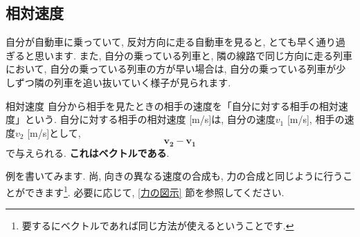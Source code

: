 \documentclass[11pt,dvipdfmx]{jsarticle}
\numberwithin{equation}{section} %
\begin{document}
\subsection{相対速度}
自分が自動車に乗っていて, 反対方向に走る自動車を見ると, とても早く通り過ぎると思います. また, 自分の乗っている列車と, 隣の線路で同じ方向に走る列車において, 自分の乗っている列車の方が早い場合は, 自分の乗っている列車が少しずつ隣の列車を追い抜いていく様子が見られます. 
\begin{freebox}{相対速度}
    自分から相手を見たときの相手の速度を「自分に対する相手の相対速度」という. 自分に対する相手の相対速度 [m/s]は, 自分の速度$v_{1}$ [m/s], 相手の速度$v_{2}$ [m/s]として, 
    \begin{equation}
        \bm{v_{2}} - \bm{v_{1}}
    \end{equation}
    で与えられる. \textbf{これはベクトルである}.
\end{freebox}
例を書いてみます. 尚, 向きの異なる速度の合成も, 力の合成と同じように行うことができます\footnote{要するにベクトルであれば同じ方法が使えるということです.}. 必要に応じて, \ref{力の図示} 節を参照してください.
\end{document}
